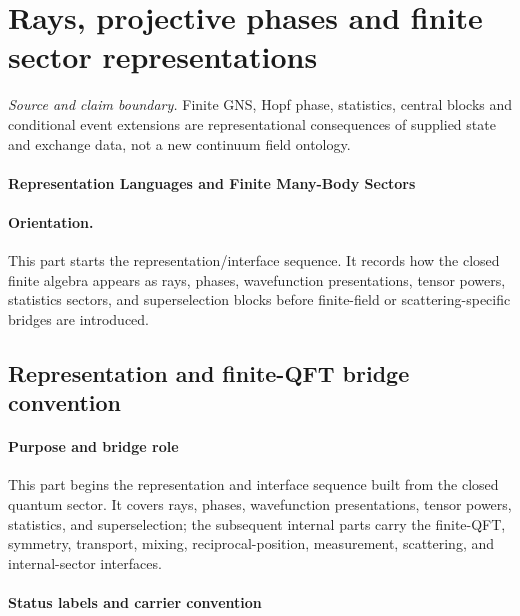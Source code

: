 \documentclass[12pt,a4paper]{article}
\begin{document}


\section{Rays, projective phases and finite sector representations}
\label{p4a:sec:v238-a6}
\noindent\textit{Source and claim boundary.} Finite GNS, Hopf phase, statistics, central blocks and conditional event extensions are representational consequences of supplied state and exchange data, not a new continuum field ontology.

\paragraph{Representation Languages and Finite Many-Body Sectors}
\label{p4:part:derived-sector}

\paragraph{Orientation.}
This part starts the representation/interface sequence.  It records how the closed finite algebra appears as rays, phases, wavefunction presentations, tensor powers, statistics sectors, and superselection blocks before finite-field or scattering-specific bridges are introduced.



\subsection{Representation and finite-QFT bridge convention}
\label{p4:sec:part2-purpose}



\paragraph{Purpose and bridge role}
\label{p4:sec:part2-purpose-role}

This part begins the representation and interface sequence built from the closed quantum sector.  It covers rays, phases, wavefunction presentations, tensor powers, statistics, and superselection; the subsequent internal parts carry the finite-QFT, symmetry, transport, mixing, reciprocal-position, measurement, scattering, and internal-sector interfaces.



\paragraph{Status labels and carrier convention}
\label{p4:sec:part2-status-labels}
\end{document}
